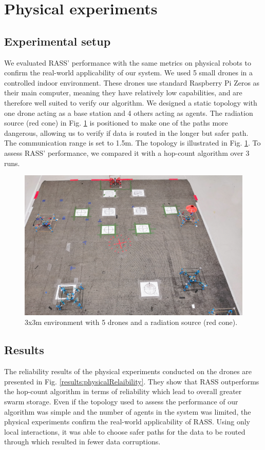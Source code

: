 \section{Physical experiments}
\label{Physical experiments}

\subsection{Experimental setup}
We evaluated \ac{RASS}' performance with the same
metrics on physical robots to confirm the real-world applicability of our system. We used 5 small drones in a controlled indoor environment. These drones use standard Raspberry Pi Zeros as their main computer, meaning they have relatively low capabilities, and are therefore well suited to verify our algorithm. We designed a static topology with one drone acting as a base station and 4 others acting as agents. The radiation source (red cone) in Fig. \ref{cogniflyExperiment} is positioned to make one of the paths more dangerous, allowing us to verify if data is routed in the longer but safer path. The communication range is set to 1.5m. The topology is illustrated in Fig. \ref{cogniflyExperiment}. To assess \ac{RASS}' performance, we compared it with a hop-count algorithm over 3 runs.

\begin{figure}[htbp]
	\centering
    \includegraphics[width=\columnwidth]{figures/dora_mesh/cognifly.jpg}
    \caption[RASS physical experiment setup]{3x3m environment with 5 drones and a radiation source (red cone).}
    \label{cogniflyExperiment}
\end{figure}

\subsection{Results}
The reliability results of the physical experiments conducted on the drones are presented in Fig. \ref{results:physicalRelaibility}. They show that \ac{RASS} outperforms the hop-count algorithm in terms of reliability which lead to overall greater swarm storage. Even if the topology used to assess the performance of our algorithm was simple and the number of agents in the system was limited, the physical experiments confirm the real-world applicability of \ac{RASS}. Using only local interactions, it was able to choose safer paths for the data to be routed through which resulted in fewer data corruptions.

